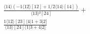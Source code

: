 \documentclass[varwidth, border=5pt]{standalone}
\begin{document}
\begin{my}
$\begin{gathered}
\scriptscriptstyle\frac{⟨14⟩(-1⟨12⟩[12]+1/2⟨14⟩[14])}{⟨13⟩²[24]} +\\
\scriptscriptstyle\frac{1⟨12⟩[23]⟨4|1+3|2]}{⟨13⟩[24]⟨1|3+4|2]} \phantom{+}
\end{gathered}$
\end{my}
\end{document}
